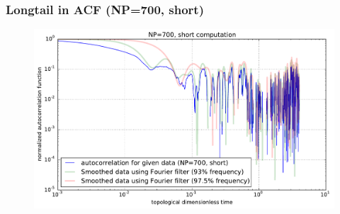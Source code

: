 \documentclass[slidestop, compress, mathserif]{beamer}
\begin{document}
\begin{frame}
  \frametitle<presentation>{Longtail in ACF (NP=700, short)}
  \begin{figure}
    \centering 
    \includegraphics[width=\textwidth]{../longtail_correlation_NP700_short_loglog.pdf}
  \end{figure}
\end{frame}



\end{document}

